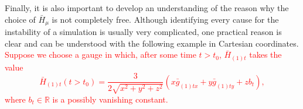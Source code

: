 \documentclass[a4paper,11pt]{article}
\numberwithin{equation}{section}
\begin{document}
Finally, it is also important to develop an understanding of the reason why the choice of $\bar{H}_\mu$ is not completely free. 
Although identifying every cause for the instability of a simulation is usually very complicated, one practical reason is clear and can be understood with the following example in Cartesian coordinates.
\textcolor{red}{Suppose we choose a gauge in which, after some time $t>t_0$, $\bar{H}_{(1)t}$ takes the value
\begin{equation} 
\bar{H}_{(1)t}(t>t_0)=\frac{3}{2\sqrt{x^2+y^2+z^2}}(x \bar{g}_{(1)tx}+y\bar{g}_{(1)ty}+z b_t),
\end{equation} 
where $b_t\in \mathbb{R}$ is a possibly vanishing constant.}
\end{document}
